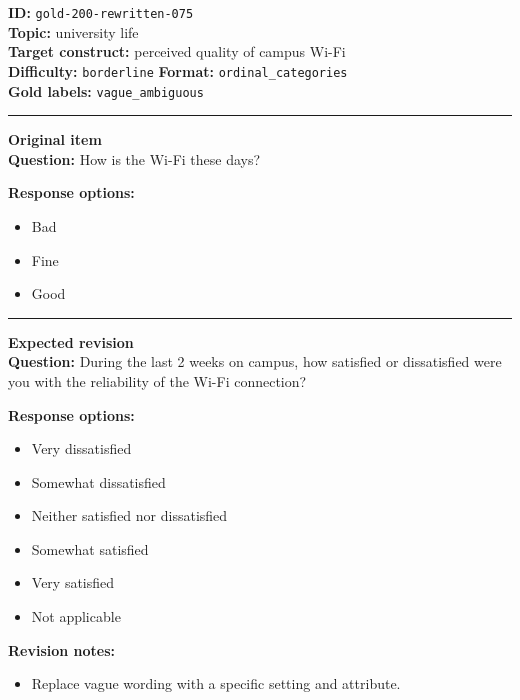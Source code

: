 \documentclass[10pt,a4paper]{article}
\newcommand{\sectionline}{\vspace{0.15em}\hrule\vspace{0.35em}}
\begin{document}
\begin{tcolorbox}[colframe=FlawRed,colback=white,colbacktitle=FlawRed!9,coltitle=black,title={Item 075\hfill Flawed item}]
\textbf{ID:} \texttt{gold-200-rewritten-075}\\
\textbf{Topic:} university life\\
\textbf{Target construct:} perceived quality of campus Wi-Fi\\
\textbf{Difficulty:} \texttt{borderline} \quad \textbf{Format:} \texttt{ordinal\_categories}\\
\textbf{Gold labels:} \texttt{vague\_ambiguous}\\
\sectionline
\textbf{Original item}\\
\textbf{Question:} How is the Wi-Fi these days?
\par\textbf{Response options:}
\begin{itemize}
\item Bad
\item Fine
\item Good
\end{itemize}
\sectionline
\textbf{Expected revision}\\
\textbf{Question:} During the last 2 weeks on campus, how satisfied or dissatisfied were you with the reliability of the Wi-Fi connection?
\par\textbf{Response options:}
\begin{itemize}
\item Very dissatisfied
\item Somewhat dissatisfied
\item Neither satisfied nor dissatisfied
\item Somewhat satisfied
\item Very satisfied
\item Not applicable
\end{itemize}
\par\textbf{Revision notes:}
\begin{itemize}
\item Replace vague wording with a specific setting and attribute.
\end{itemize}
\end{tcolorbox}
\end{document}
